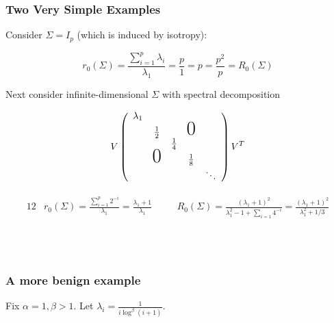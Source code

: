 \documentclass[pdf]{beamer}
\begin{document}
\begin{frame}
\frametitle{Two Very Simple Examples}
\fontsize{7pt}{7pt}
Consider $\Sigma = I_{p}$ (which is induced by isotropy):

\[ r_{0}(\Sigma) = \frac{\sum^{p}_{i=1}\lambda_{i}}{\lambda_{1}} = \frac{p}{1} = p = \frac{p^{2}}{p} = R_{0}(\Sigma) \] 

Next consider infinite-dimensional $\Sigma$ with spectral decomposition

\[
    V \left(
    \begin{array}{ccccc}
    \lambda_{1}                                    \\
      & \frac{1}{2}   &   & \text{\huge0} \\
      &               & \frac{1}{4}                   \\
      &\text{\huge0} &   & \frac{1}{8}           \\
      &               &   &   & \ddots
    \end{array}
    \right) V^{T}
\] 

    \begin{alignat*}{12}
    & r_{0}(\Sigma) = \frac{\sum^{p}_{i=1}2^{-i}}{\lambda_{1}} = \frac{\lambda_{1}+1}{\lambda_{1}} \quad && R_{0}(\Sigma) = \frac{(\lambda_{1}+1)^{2}}{\lambda_{1}^{2} - 1 + \sum_{i=1}4^{-i}} = \frac{(\lambda_{1}+1)^{2}}{\lambda_{1}^{2} + 1/3} 
    \end{alignat*}

\\
\\

\end{frame}

\begin{frame}
\frametitle{A more benign example}
\fontsize{17pt}{17pt}

\begin{example}
Fix $\alpha = 1, \beta > 1$.  Let $\lambda_{i} = \frac{1}{i \log^{\beta}(i+1)}$.

\end{example}

\end{frame}
\end{document}
